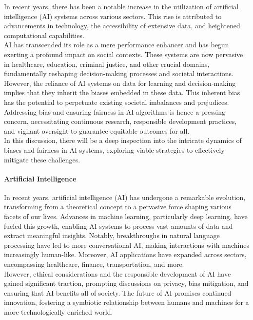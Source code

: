 \documentclass[12pt,a4paper,openright,twoside]{book}
\begin{document}
In recent years, there has been a notable increase in the utilization of artificial intelligence (AI) systems across various sectors. This rise is attributed to advancements in technology, the accessibility of extensive data, and heightened computational capabilities. \\
AI has transcended its role as a mere performance enhancer and has begun exerting a profound impact on social contexts. These systems are now pervasive in healthcare, education, criminal justice, and other crucial domains, fundamentally reshaping decision-making processes and societal interactions. However, the reliance of AI systems on data for learning and decision-making implies that they inherit the biases embedded in these data. This inherent bias has the potential to perpetuate existing societal imbalances and prejudices. \\
Addressing bias and ensuring fairness in AI algorithms is hence a pressing concern, necessitating continuous research, responsible development practices, and vigilant oversight to guarantee equitable outcomes for all. \\ 
In this discussion, there will be a deep inspection into the intricate dynamics of biases and fairness in AI systems, exploring viable strategies to effectively mitigate these challenges.

\paragraph{Artificial Intelligence}
In recent years, artificial intelligence (AI) has undergone a remarkable evolution, transforming from a theoretical concept to a pervasive force shaping various facets of our lives. Advances in machine learning, particularly deep learning, have fueled this growth, enabling AI systems to process vast amounts of data and extract meaningful insights. 
Notably, breakthroughs in natural language processing have led to more conversational AI, making interactions with machines increasingly human-like. Moreover, AI applications have expanded across sectors, encompassing healthcare, finance, transportation, and more. \\
However, ethical considerations and the responsible development of AI have gained significant traction, prompting discussions on privacy, bias mitigation, and ensuring that AI benefits all of society. The future of AI promises continued innovation, fostering a symbiotic relationship between humans and machines for a more technologically enriched world. \cite{10.1145/3457607}
\end{document}
